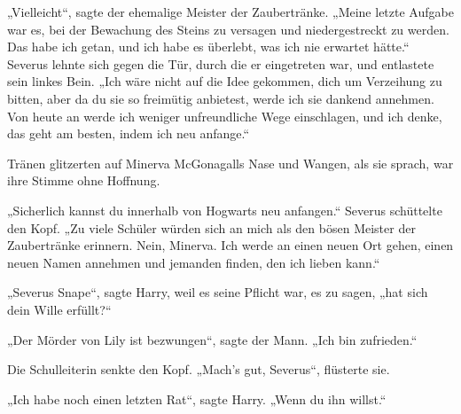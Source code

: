 „Vielleicht“, sagte der ehemalige Meister der Zaubertränke. „Meine letzte Aufgabe war es, bei der Bewachung des Steins zu versagen und niedergestreckt zu werden. Das habe ich getan, und ich habe es überlebt, was ich nie erwartet hätte.“
Severus lehnte sich gegen die Tür, durch die er eingetreten war, und entlastete sein linkes Bein.
„Ich wäre nicht auf die Idee gekommen, dich um Verzeihung zu bitten, aber da du sie so freimütig anbietest, werde ich sie dankend annehmen. Von heute an werde ich weniger unfreundliche Wege einschlagen, und ich denke, das geht am besten, indem ich neu anfange.“

Tränen glitzerten auf Minerva McGonagalls Nase und Wangen, als sie sprach, war ihre Stimme ohne Hoffnung.

„Sicherlich kannst du innerhalb von Hogwarts neu anfangen.“
Severus schüttelte den Kopf.
„Zu viele Schüler würden sich an mich als den bösen Meister der Zaubertränke erinnern. Nein, Minerva. Ich werde an einen neuen Ort gehen, einen neuen Namen annehmen und jemanden finden, den ich lieben kann.“

„Severus Snape“, sagte Harry, weil es seine Pflicht war, es zu sagen, „hat sich dein Wille erfüllt?“

„Der Mörder von Lily ist bezwungen“, sagte der Mann. „Ich bin zufrieden.“

Die Schulleiterin senkte den Kopf.
„Mach’s gut, Severus“, flüsterte sie.

„Ich habe noch einen letzten Rat“, sagte Harry. „Wenn du ihn willst.“

